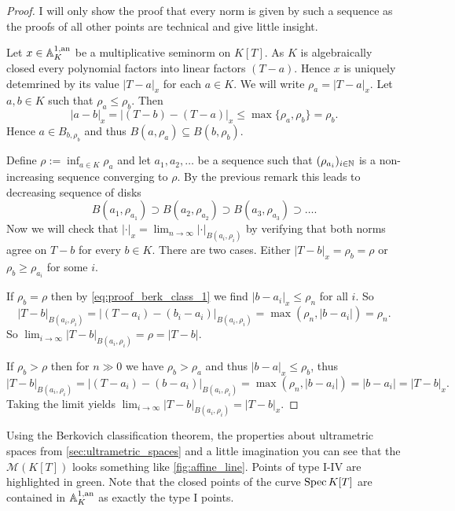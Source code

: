 \begin{proof}
	I will only show the proof that every norm is given by such a sequence as the proofs of all other points are technical and give little insight. 

	Let $x \in \mathbb{A}_K^{1, \text{an}}$ be a multiplicative seminorm on $K[T]$. 
	As  $K$ is algebraically closed every polynomial factors into linear factors $(T-a)$. 
	Hence $x$ is uniquely detemrined by its value $|T-a|_x$ for each $a \in K$. 
	We will write $\rho_a = |T-a|_x$.
	Let  $a, b \in K$ such that $\rho_a \le \rho_b$. 
	Then  \begin{equation}\label{eq:proof_berk_class_1}
		|a - b|_x = |(T-b) - (T - a)|_x \le \max \{\rho_a, \rho_b\} = \rho_b 
	.\end{equation} 
	Hence $a \in B_{b, \rho_b}$ and thus  $B(a, \rho_a) \subseteq B(b, \rho_b)$. 

	Define $\rho := \inf_{a \in K} \rho_a$ and let $a_1, a_2, \ldots$ be a sequence such that $(\rho_{a_i})_{i \in \mathbb{N}}  $ is a non-increasing sequence converging to $\rho$. 
	By the previous remark this leads to decreasing sequence of disks \[
		B(a_1, \rho_{a_1}) \supset B(a_2, \rho_{a_2}) \supset B(a_3, \rho_{a_3}) \supset\ldots
	.\] 
	Now we will check that $|\cdot |_x = \lim_{n \to \infty} |\cdot |_{B(a_i, \rho_i)}$ by verifying that both norms agree on $T- b$ for every $b \in K$. 
	 There are two cases. Either $|T - b|_x = \rho_b = \rho$ or $\rho_b \ge \rho_{a_i}$ for some $i$. 

	 If $ \rho_b = \rho$ then by \eqref{eq:proof_berk_class_1} we find $|b - a_i|_x \le \rho_n$ for all $i$.
	 So \[
		 |T - b|_{B(a_i, \rho_i)} = |(T - a_i) - (b_i - a_i)|_{B(a_i, \rho_i)} = \max(\rho_n, |b - a_i|) = \rho_n
	 .\]
	 So $\lim_{i \to \infty} |T- b|_{B(a_i, \rho_i)} = \rho = |T - b|$. 

	 If $\rho_b > \rho$ then for $n \gg 0$ we have $\rho_b > \rho_a$ and thus $|b - a|_x \le \rho_b$, thus \[
		 |T - b|_{B(a_i, \rho_i)} = |(T - a_i) - (b -a_i)|_{B(a_i, \rho_i)} = \max (\rho_n, |b - a_i|) = |b - a_i| = |T - b|_x
	 .\]   
	 Taking the limit yields $\lim_{i \to \infty} |T- b| _{B(a_i, \rho_{i})} = |T - b|_x$.
\end{proof}

Using the Berkovich classification theorem, the properties about ultrametric spaces from \cref{sec:ultrametric_spaces} and a little imagination you can see that the $\mathcal{M} (K[T])$ looks something like \cref{fig:affine_line}. 
Points of type I-IV are highlighted in green. Note that the closed points of the curve $\operatorname{Spec} K[T]$ are contained in  $\mathbb{A}_K^{1,\text{an}}$ as exactly the type I points. 


